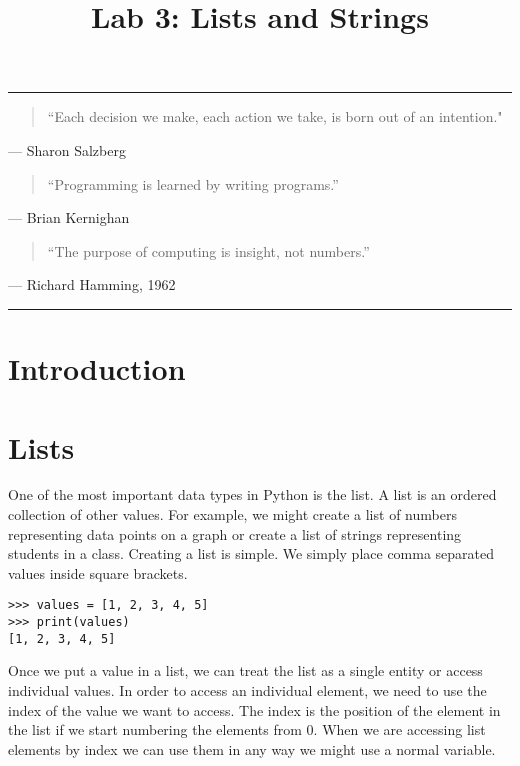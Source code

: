 \documentclass[11pt]{cselabheader}
\title{Lab 3: Lists and Strings}
\begin{document}
\maketitle

\hrule

\begin{quotation}
``Each decision we make, each action we take, is born out of an intention."
\end{quotation}
\begin{flushright}
--- Sharon Salzberg
\end{flushright}

\begin{quotation}
``Programming is learned by writing programs.''
\end{quotation}
\begin{flushright}
--- Brian Kernighan
\end{flushright}

\begin{quotation}
``The purpose of computing is insight, not numbers.''
\end{quotation}
\begin{flushright}
--- Richard Hamming, 1962
\end{flushright}

\hrule

\section{Introduction}

\section{Lists}
One of the most important data types in Python is the list. A list is an ordered collection of other values. For example, we might create a list of numbers representing data points on a graph or create a list of strings representing students in a class. Creating a list is simple. We simply place comma separated values inside square brackets.

\begin{lstlisting}[style=ipython]
>>> values = [1, 2, 3, 4, 5]
>>> print(values)
[1, 2, 3, 4, 5]
\end{lstlisting}

Once we put a value in a list, we can treat the list as a single entity or access individual values. In order to access an individual element, we need to use the index of the value we want to access. The index is the position of the element in the list if we start numbering the elements from 0. When we are accessing list elements by index we can use them in any way we might use a normal variable.
\end{document}
